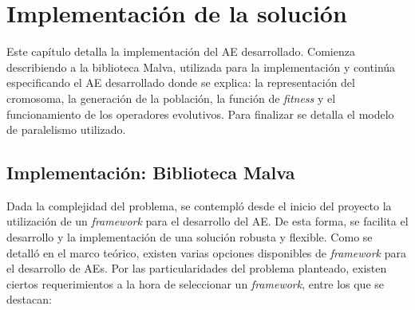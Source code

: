 \chapter{Implementación de la solución}

Este capítulo detalla la implementación del AE desarrollado. Comienza describiendo a la biblioteca Malva, utilizada para la implementación y continúa especificando el AE desarrollado donde se explica: la representación del cromosoma, la generación de la población, la función de \emph{fitness} y el funcionamiento de los operadores evolutivos. Para finalizar se detalla el modelo de paralelismo utilizado.

\section{Implementación: Biblioteca Malva}

Dada la complejidad del problema, se contempló desde el inicio del proyecto la utilización de un \emph{framework} para el desarrollo del AE. De esta forma, se facilita el desarrollo y la implementación de una solución robusta y flexible. Como se detalló en el marco teórico, existen varias opciones disponibles de \emph{framework} para el desarrollo de AEs. Por las particularidades del problema planteado, existen ciertos requerimientos a la hora de seleccionar un \emph{framework}, entre los que se destacan:

